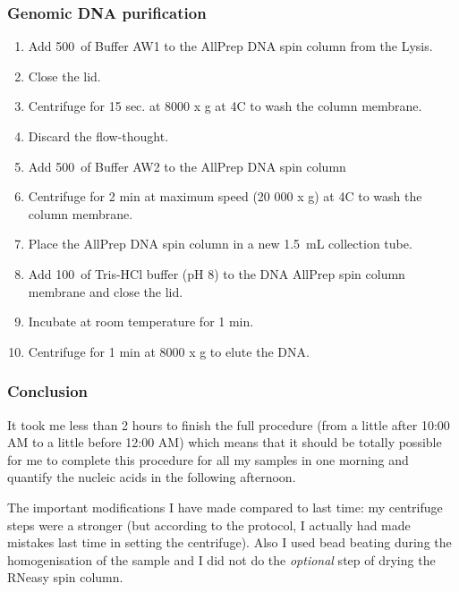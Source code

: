 \subsubsection{Genomic DNA purification}

\begin{enumerate}
\item Add 500~\uL of Buffer AW1 to the AllPrep DNA spin column from the Lysis.
\item Close the lid.
\item Centrifuge for 15 sec. at 8000 x g at 4\degree C to wash the column membrane.
\item Discard the flow-thought.
\item Add 500~\uL of Buffer AW2 to the AllPrep DNA spin column
\item Centrifuge for 2 min at maximum speed (20 000 x g) at 4\degree C to wash the column membrane.
\item Place the AllPrep DNA spin column in a new 1.5~mL collection tube.
\item Add 100~\uL of Tris-HCl buffer (pH 8) to the DNA AllPrep spin column membrane and close the lid.
\item Incubate at room temperature for 1 min.
\item Centrifuge for 1 min at 8000 x g to elute the DNA.
\end{enumerate}

\subsubsection{Conclusion}

It took me less than 2 hours to finish the full procedure (from a little after 10:00 AM to a little before 12:00 AM) which means that it should be totally possible for me to complete this procedure for all my samples in one morning and quantify the nucleic acids in the following afternoon.

The important modifications I have made compared to last time: my centrifuge steps were a stronger (but according to the protocol, I actually had made mistakes last time in setting the centrifuge). Also I used bead beating during the homogenisation of the sample and I did not do the \textit{optional} step of drying the RNeasy spin column.



